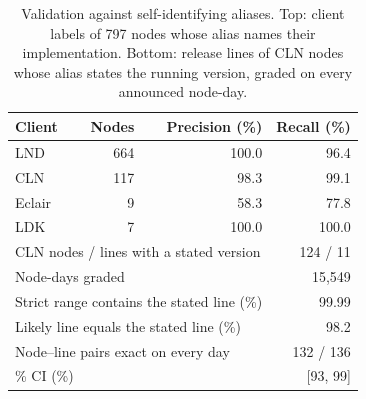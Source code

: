 \begin{table}[t]
\centering\small
\caption{Validation against self-identifying aliases. Top: client labels of 797 nodes whose alias names their implementation. Bottom: release lines of CLN nodes whose alias states the running version, graded on every announced node-day.}
\label{tab:validation}
\begin{tabular}{lrrr}
\toprule
Client & Nodes & Precision (\%) & Recall (\%) \\
\midrule
LND & 664 & 100.0 & 96.4 \\
CLN & 117 & 98.3 & 99.1 \\
Eclair & 9 & 58.3 & 77.8 \\
LDK & 7 & 100.0 & 100.0 \\
\midrule
\multicolumn{3}{l}{CLN nodes / lines with a stated version} & 124 / 11 \\
\multicolumn{3}{l}{Node-days graded} & 15,549 \\
\multicolumn{3}{l}{Strict range contains the stated line (\%)} & 99.99 \\
\multicolumn{3}{l}{Likely line equals the stated line (\%)} & 98.2 \\
\multicolumn{3}{l}{Node--line pairs exact on every day} & 132 / 136 \\
\multicolumn{3}{l}{\quad 95\% CI (\%)} & [93, 99] \\
\bottomrule
\end{tabular}
\end{table}
